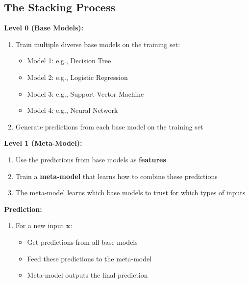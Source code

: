 \documentclass[11pt,a4paper]{article}
\theoremstyle{definition}
\theoremstyle{plain}
\theoremstyle{remark}
\begin{document}
\subsection{The Stacking Process}

\begin{tcolorbox}[colback=purple!5!white,colframe=purple!75!black,title=\textbf{Stacking Algorithm}]
\textbf{Level 0 (Base Models):}
\begin{enumerate}
    \item Train multiple diverse base models on the training set:
    \begin{itemize}
        \item Model 1: e.g., Decision Tree
        \item Model 2: e.g., Logistic Regression
        \item Model 3: e.g., Support Vector Machine
        \item Model 4: e.g., Neural Network
    \end{itemize}
    
    \item Generate predictions from each base model on the training set
\end{enumerate}

\textbf{Level 1 (Meta-Model):}
\begin{enumerate}
    \item Use the predictions from base models as \textbf{features}
    
    \item Train a \textbf{meta-model} that learns how to combine these predictions
    
    \item The meta-model learns which base models to trust for which types of inputs
\end{enumerate}

\textbf{Prediction:}
\begin{enumerate}
    \item For a new input \(\mathbf{x}\):
    \begin{itemize}
        \item Get predictions from all base models
        \item Feed these predictions to the meta-model
        \item Meta-model outputs the final prediction
    \end{itemize}
\end{enumerate}
\end{tcolorbox}
\end{document}
